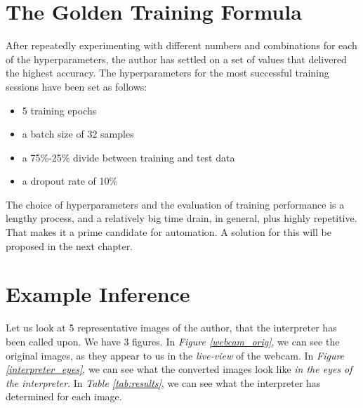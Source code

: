 \section{The Golden Training Formula}
After repeatedly experimenting with different numbers and combinations for each of the hyperparameters, the author has settled on a set of values that delivered the highest accuracy. The hyperparameters for the most successful training sessions have been set as follows: 
\begin{itemize}
    \item 5 training epochs
    \item a batch size of 32 samples
    \item a 75\%-25\% divide between training and test data
    \item a dropout rate of 10\%
\end{itemize}
The choice of hyperparameters and the evaluation of training performance is a lengthy process, and a relatively big time drain, in general, plus highly repetitive. That makes it a prime candidate for automation. A solution for this will be proposed in the next chapter.
\section{Example Inference}
Let us look at 5 representative images of the author, that the interpreter has been called upon. We have 3 figures. In \textit{Figure \ref{webcam_orig}}, we can see the original images, as they appear to us in the \textit{live-view} of the webcam. In \textit{Figure \ref{interpreter_eyes}}, we can see what the converted images look like \textit{in the eyes of the interpreter}. In \textit{Table \ref{tab:results}}, we can see what the interpreter has determined for each image. \par

